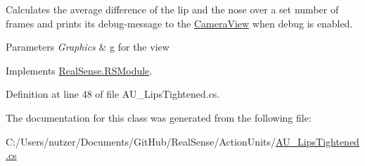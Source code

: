 Calculates the average difference of the lip and the nose over a set number of frames and prints its\textquotesingle{} debug-\/message to the \hyperlink{class_real_sense_1_1_camera_view}{Camera\+View} when debug is enabled. 
\begin{DoxyParams}{Parameters}
{\em Graphics} & g for the view \\
\hline
\end{DoxyParams}


Implements \hyperlink{class_real_sense_1_1_r_s_module_a2ec830b7932ee7c0077d473f81c73867}{Real\+Sense.\+R\+S\+Module}.



Definition at line 48 of file A\+U\+\_\+\+Lips\+Tightened.\+cs.



The documentation for this class was generated from the following file\+:\begin{DoxyCompactItemize}
\item 
C\+:/\+Users/nutzer/\+Documents/\+Git\+Hub/\+Real\+Sense/\+Action\+Units/\hyperlink{_a_u___lips_tightened_8cs}{A\+U\+\_\+\+Lips\+Tightened.\+cs}\end{DoxyCompactItemize}
